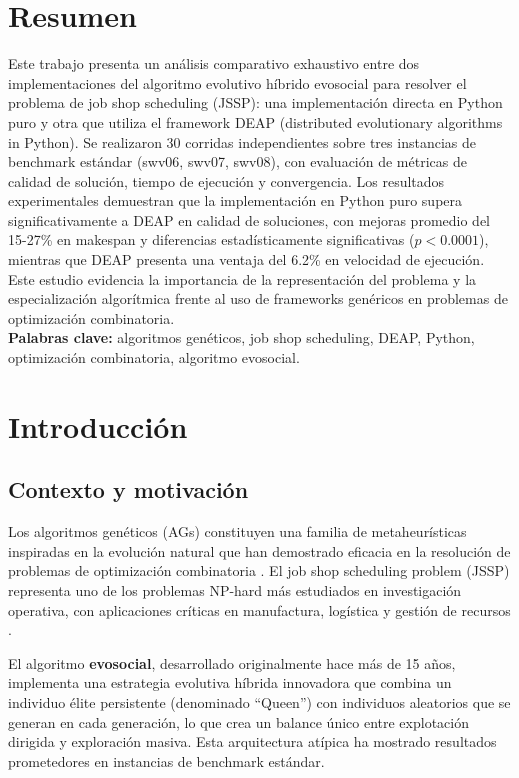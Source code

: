 \documentclass[12pt,a4paper]{article}
\begin{document}
\section{Resumen}

Este trabajo presenta un análisis comparativo exhaustivo entre dos implementaciones del algoritmo evolutivo híbrido evosocial para resolver el problema de job shop scheduling (JSSP): una implementación directa en Python puro y otra que utiliza el framework DEAP (distributed evolutionary algorithms in Python). Se realizaron 30 corridas independientes sobre tres instancias de benchmark estándar (swv06, swv07, swv08), con evaluación de métricas de calidad de solución, tiempo de ejecución y convergencia. Los resultados experimentales demuestran que la implementación en Python puro supera significativamente a DEAP en calidad de soluciones, con mejoras promedio del 15-27\% en makespan y diferencias estadísticamente significativas ($p < 0.0001$), mientras que DEAP presenta una ventaja del 6.2\% en velocidad de ejecución. Este estudio evidencia la importancia de la representación del problema y la especialización algorítmica frente al uso de frameworks genéricos en problemas de optimización combinatoria.\\


\textbf{Palabras clave:} algoritmos genéticos, job shop scheduling, DEAP, Python, optimización combinatoria, algoritmo evosocial.

\section{Introducción}

\subsection{Contexto y motivación}

Los algoritmos genéticos (AGs) constituyen una familia de metaheurísticas inspiradas en la evolución natural que han demostrado eficacia en la resolución de problemas de optimización combinatoria \cite{goldberg1989genetic}. El job shop scheduling problem (JSSP) representa uno de los problemas NP-hard más estudiados en investigación operativa, con aplicaciones críticas en manufactura, logística y gestión de recursos \cite{garey1979computers}.

El algoritmo \textbf{evosocial}, desarrollado originalmente hace más de 15 años, implementa una estrategia evolutiva híbrida innovadora que combina un individuo élite persistente (denominado ``Queen'') con individuos aleatorios que se generan en cada generación, lo que crea un balance único entre explotación dirigida y exploración masiva. Esta arquitectura atípica ha mostrado resultados prometedores en instancias de benchmark estándar.
\end{document}

